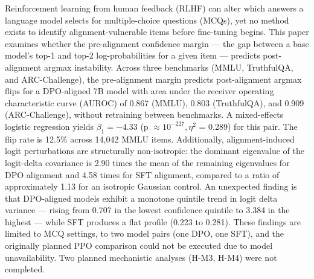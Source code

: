 
Reinforcement learning from human feedback (RLHF) can alter which answers a language model selects for multiple-choice questions (MCQs), yet no method exists to identify alignment-vulnerable items before fine-tuning begins. This paper examines whether the pre-alignment confidence margin --- the gap between a base model's top-1 and top-2 log-probabilities for a given item --- predicts post-alignment argmax instability. Across three benchmarks (MMLU, TruthfulQA, and ARC-Challenge), the pre-alignment margin predicts post-alignment argmax flips for a DPO-aligned 7B model with area under the receiver operating characteristic curve (AUROC) of 0.867 (MMLU), 0.803 (TruthfulQA), and 0.909 (ARC-Challenge), without retraining between benchmarks. A mixed-effects logistic regression yields $\beta _1 = -4.33$ (p $\approx 10^{-227}, \eta^2$ = 0.289) for this pair. The flip rate is 12.5\% across 14,042 MMLU items. Additionally, alignment-induced logit perturbations are structurally non-isotropic: the dominant eigenvalue of the logit-delta covariance is 2.90 times the mean of the remaining eigenvalues for DPO alignment and 4.58 times for SFT alignment, compared to a ratio of approximately 1.13 for an isotropic Gaussian control. An unexpected finding is that DPO-aligned models exhibit a monotone quintile trend in logit delta variance --- rising from 0.707 in the lowest confidence quintile to 3.384 in the highest --- while SFT produces a flat profile (0.223 to 0.281). These findings are limited to MCQ settings, to two model pairs (one DPO, one SFT), and the originally planned PPO comparison could not be executed due to model unavailability. Two planned mechanistic analyses (H-M3, H-M4) were not completed.

